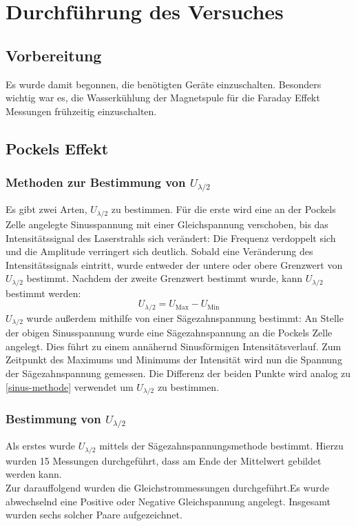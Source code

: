 \section{Durchführung des Versuches}
\subsection{Vorbereitung}
Es wurde damit begonnen, die benötigten Geräte einzuschalten. Besonders wichtig war es, die Wasserkühlung der Magnetspule für die Faraday Effekt Messungen frühzeitig einzuschalten. 
\subsection{Pockels Effekt}

\subsubsection{Methoden zur Bestimmung von $U_{\lambda/2}$}
Es gibt zwei Arten, $U_{\lambda /2}$ zu bestimmen. Für die erste wird eine an der Pockels Zelle angelegte Sinusspannung mit einer Gleichspannung verschoben, bis das Intensitätssignal des Laserstrahls sich verändert: Die Frequenz verdoppelt sich und die Amplitude verringert sich deutlich. Sobald eine Veränderung des Intensitätssignals eintritt, wurde entweder der untere oder obere Grenzwert von $U_{\lambda/2}$ bestimmt. Nachdem der zweite Grenzwert bestimmt wurde, kann $U_{\lambda/2}$ bestimmt werden:
\begin{equation}\label{sinus-methode}
U_{\lambda/2} = U_{\textrm{Max}} - U_{\textrm{Min}}
\end{equation}
$U_{\lambda/2}$ wurde außerdem mithilfe von einer Sägezahnspannung bestimmt: An Stelle der obigen Sinusspannung wurde eine Sägezahnspannung an die Pockels Zelle angelegt. Dies führt zu einem annähernd Sinusförmigen Intensitätsverlauf. Zum Zeitpunkt des Maximums und Minimums der Intensität wird nun die Spannung der Sägezahnspannung gemessen. Die Differenz der beiden Punkte wird analog zu \ref{sinus-methode} verwendet um $U_{\lambda/2}$ zu bestimmen.

\subsubsection{Bestimmung von $U_{\lambda/2}$}
Als erstes wurde $U_{\lambda/2}$ mittels der Sägezahnspannungsmethode bestimmt. Hierzu wurden 15 Messungen durchgeführt, dass am Ende der Mittelwert gebildet werden kann.\\
Zur darauffolgend wurden die Gleichstrommessungen durchgeführt.Es wurde abwechselnd eine Positive oder Negative Gleichspannung angelegt. Insgesamt wurden sechs solcher Paare aufgezeichnet.

